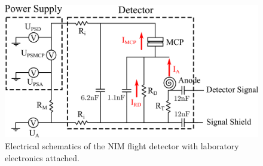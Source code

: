 	\begin{figure}[h] %
		\centering
		\includegraphics[width = .8\textwidth]{Bilder/Detector_elec_schema.png}
		\caption{Electrical schematics of the NIM flight detector with laboratory electronics attached.}
		\label{fig:FlighElecSchema}
	\end{figure}
